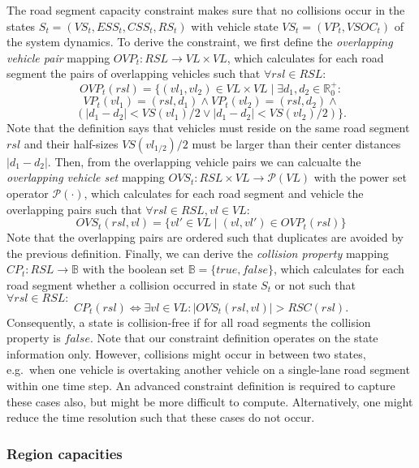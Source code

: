 The road segment capacity constraint makes sure that no collisions occur in the states $S_t = (VS_t, ESS_t, CSS_t, RS_t)$ with vehicle state $VS_t = (VP_t, VSOC_t)$ of the system dynamics. To derive the constraint, we first define the \textit{overlapping vehicle pair} mapping $OVP_t : RSL \rightarrow VL \times VL$, which calculates for each road segment the pairs of overlapping vehicles such that $\forall rsl \in RSL:$
\[
	OVP_t(rsl) = \{(vl_1, vl_2) \in VL \times VL \mid \exists d_1, d_2 \in \mathbb{R}_0^+:
\]
\[
	VP_t(vl_1) = (rsl, d_1) \wedge VP_t(vl_2) = (rsl, d_2) \wedge
\]
\[
	(|d_1 - d_2| < VS(vl_1) / 2 \vee |d_1 - d_2| < VS(vl_2) / 2) \} \textrm{.}
\]
Note that the definition says that vehicles must reside on the same road segment $rsl$ and their half-sizes $VS(vl_{1/2}) / 2$ must be larger than their center distances $|d_1 - d_2|$. Then, from the overlapping vehicle pairs we can calcualte the \textit{overlapping vehicle set} mapping $OVS_t : RSL \times VL \rightarrow \mathcal{P}(VL)$ with the power set operator $\mathcal{P}(\cdot)$, which calculates for each road segment and vehicle the overlapping pairs such that $\forall rsl \in RSL, vl \in VL:$
\[
	OVS_t(rsl,vl) = \{vl' \in VL \mid (vl, vl') \in OVP_t(rsl)\}
\]
Note that the overlapping pairs are ordered such that duplicates are avoided by the previous definition. Finally, we can derive the \textit{collision property} mapping $CP_t : RSL \rightarrow \mathbb{B}$ with the boolean set $\mathbb{B} = \{true, false\}$, which calculates for each road segment whether a collision occurred in state $S_t$ or not such that $\forall rsl \in RSL:$
\[
	CP_t(rsl) \Leftrightarrow \exists vl \in VL : |OVS_t(rsl, vl)| > RSC(rsl) \textrm{.}
\]
Consequently, a state is collision-free if for all road segments the collision property is $false$. Note that our constraint definition operates on the state information only. However, collisions might occur in between two states, e.g.\ when one vehicle is overtaking another vehicle on a single-lane road segment within one time step. An advanced constraint definition is required to capture these cases also, but might be more difficult to compute. Alternatively, one might reduce the time resolution such that these cases do not occur.

\subsubsection{Region capacities}
\label{capacities}

